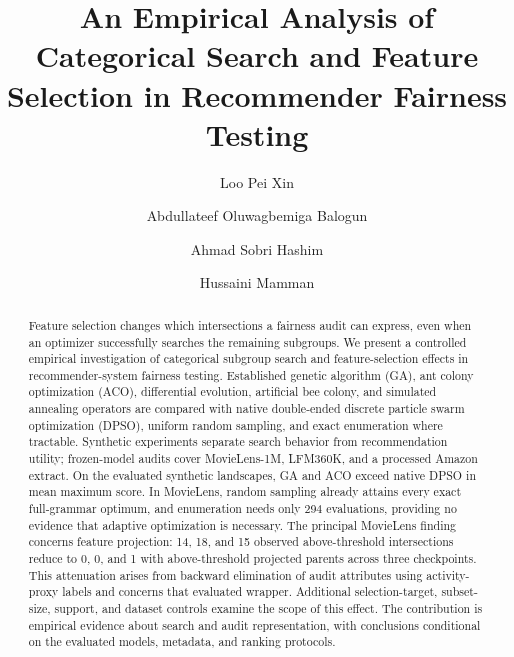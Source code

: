 \documentclass[sigconf,nonacm]{acmart}
\begin{document}
\title[Categorical Search and Feature Selection in Recommender Fairness Testing]{An Empirical Analysis of Categorical Search and Feature Selection in Recommender Fairness Testing}

\author{Loo Pei Xin}

\author{Abdullateef Oluwagbemiga Balogun}

\author{Ahmad Sobri Hashim}

\author{Hussaini Mamman}

\renewcommand{\shortauthors}{Loo Pei Xin et al.}

\begin{abstract}
Feature selection changes which intersections a fairness audit can express, even when an optimizer successfully searches the remaining subgroups. We present a controlled empirical investigation of categorical subgroup search and feature-selection effects in recommender-system fairness testing. Established genetic algorithm (GA), ant colony optimization (ACO), differential evolution, artificial bee colony, and simulated annealing operators are compared with native double-ended discrete particle swarm optimization (DPSO), uniform random sampling, and exact enumeration where tractable. Synthetic experiments separate search behavior from recommendation utility; frozen-model audits cover MovieLens-1M, LFM360K, and a processed Amazon extract. On the evaluated synthetic landscapes, GA and ACO exceed native DPSO in mean maximum score. In MovieLens, random sampling already attains every exact full-grammar optimum, and enumeration needs only 294 evaluations, providing no evidence that adaptive optimization is necessary. The principal MovieLens finding concerns feature projection: 14, 18, and 15 observed above-threshold intersections reduce to 0, 0, and 1 with above-threshold projected parents across three checkpoints. This attenuation arises from backward elimination of audit attributes using activity-proxy labels and concerns that evaluated wrapper. Additional selection-target, subset-size, support, and dataset controls examine the scope of this effect. The contribution is empirical evidence about search and audit representation, with conclusions conditional on the evaluated models, metadata, and ranking protocols.
\end{abstract}
\end{document}
